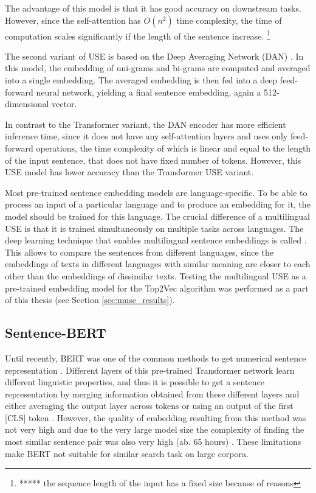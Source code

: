 \documentclass[fontsize=12pt,a4paper,twoside,openany]{scrbook}
\begin{document}
The advantage of this model is that it has good accuracy on downstream tasks. However, since the self-attention has \(O(n^2)\) time complexity, the time of computation scales significantly if the length of the sentence increase. \footnote{*****  the sequence length of the input has a fixed size because of reasons}

The second variant of USE is based on the Deep Averaging Network (DAN) \parencite{Iyyer15}. In this model, the embedding of uni-grams and bi-grams are computed and averaged into a single embedding. The averaged embedding is then fed into a deep feed-forward neural network, yielding a final sentence embedding, again a 512-dimensional vector.

In contrast to the Transformer variant, the DAN encoder has more efficient inference time, since it does not have any self-attention layers and uses only feed-forward operations, the time complexity of which is linear and equal to the length of the input sentence, that does not have fixed number of tokens. However, this USE model has lower accuracy than the Transformer USE variant. 

Most pre-trained sentence embedding models are language-specific. To be able to process an input of a particular language and to produce an embedding for it, the model should be trained for this language. The crucial difference of a multilingual USE is that it is trained simultaneously on multiple tasks across languages. The deep learning technique that enables multilingual sentence embeddings is called  \parencite{Chidambaram19}. This allows to compare the sentences from different languages, since the embeddings of texts in different languages with similar meaning are closer to each other than the embeddings of dissimilar texts. 
Testing the multilingual USE as a pre-trained embedding model for the Top2Vec algorithm was performed as a part of this thesis (see Section \ref{sec:muse_results}).

\subsection{Sentence-BERT}
\label{sec:sbert}

Until recently, BERT was one of the common methods to get numerical sentence representation \parencite{Devlin19}. Different layers of this pre-trained Transformer network learn different linguistic properties, and thus it is possible to get a sentence representation by merging information obtained from these different layers and either averaging the output layer across tokens or using an output of the first [CLS] token \parencite{Wang20}. However, the quality of embedding resulting from this method was not very high and due to the very large model size the complexity of finding the most similar sentence pair was also very high (ab. 65 hours) \parencite{Reimers19}. These limitations make BERT not suitable for similar search task on large corpora.
\end{document}
